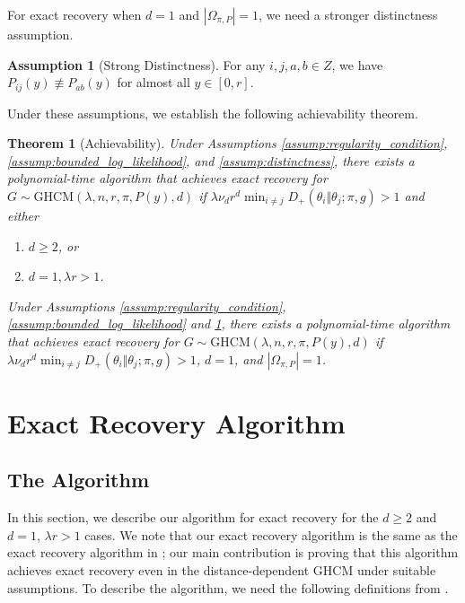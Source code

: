 \documentclass{article}
\newcommand{\1}{\mathbbm{1}}
\theoremstyle{definition}
\newtheorem{assumption}{Assumption}
\theoremstyle{plain}
\newtheorem{theorem}{Theorem}
\begin{document}
For exact recovery when $d = 1$ and $|\Omega_{\pi, P}| = 1$, we need a stronger distinctness assumption.

\begin{assumption}[Strong Distinctness]
\label{assump:strong_distinctness}
For any $i, j, a, b \in Z$, we have $P_{ij}(y) \not \equiv P_{ab}(y)$ for almost all $y \in [0, r]$.
\end{assumption}

Under these assumptions, we establish the following achievability theorem.

\begin{theorem}[Achievability]
\label{thm:achievability}
    Under Assumptions \ref{assump:regularity_condition}, \ref{assump:bounded_log_likelihood}, and \ref{assump:distinctness}, there exists a polynomial-time algorithm that achieves exact recovery for $G \sim \text{GHCM}(\lambda, n, r, \pi, P(y), d)$ if $\lambda \nu_d r^d \min_{i \neq j} D_+(\theta_i \Vert \theta_j; \pi, g) > 1$ and either
    \begin{enumerate}
        \item $d \geq 2$, or 
        \item $d = 1, \lambda r > 1$.
    \end{enumerate}
    Under Assumptions \ref{assump:regularity_condition}, \ref{assump:bounded_log_likelihood} and \ref{assump:strong_distinctness}, there exists a polynomial-time algorithm that achieves exact recovery for $G \sim \text{GHCM}(\lambda, n, r, \pi, P(y), d)$ if $\lambda \nu_d r^d \min_{i \neq j} D_+(\theta_i \Vert \theta_j; \pi, g) > 1$, $d = 1$, and $|\Omega_{\pi, P}| = 1$.
\end{theorem}


\section{Exact Recovery Algorithm}
\label{sec:exact_recovery_algorithm}
\subsection{The Algorithm}
In this section, we describe our algorithm for exact recovery for the $d \geq 2$ and $d = 1$, $\lambda r > 1$ cases. We note that our exact recovery algorithm is the same as the exact recovery algorithm in \cite{Gaudio+2025}; our main contribution is proving that this algorithm achieves exact recovery even in the distance-dependent GHCM under suitable assumptions. To describe the algorithm, we need the following definitions from \cite{Gaudio+2025}.
\end{document}

